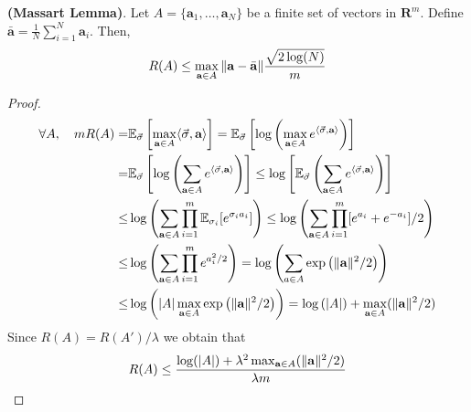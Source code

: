 \begin{lemma}
    \textbf{(Massart Lemma)}.
    Let $ A = \{ \mathbf{a}_1, \ldots, \mathbf{a}_N \} $ be a finite set of vectors in $ \mathbf{R}^m $.
    Define $ \bar{ \mathbf{a}} = \frac{1}{N} \sum^{N}_{i=1} \mathbf{a}_i $. Then,
    \begin{equation}
        R(A) \le \max_{\mathbf{a} \in A} \Arrowvert \mathbf{a} - \bar{\mathbf{a}} \Arrowvert
        \frac{\sqrt{2\log(N)}}{m} 
    \end{equation}
    \begin{proof}
        \begin{align*}
            \forall A,\quad
            m R(A) =& \mathbb{E}_{\vec\sigma} \left[ \max_{\mathbf{a}\in A } \langle \vec \sigma, \textbf{a} \rangle \right]
            = \mathbb{E}_{\vec\sigma}\left[ \log \left(  \max_{\mathbf{a}\in A } e^{\langle \vec \sigma, \textbf{a} \rangle } \right) \right]\\
            =& \mathbb{E}_{\vec\sigma}\left[ \log \left(  \sum_{\mathbf{a}\in A } e^{\langle \vec \sigma, \textbf{a} \rangle } \right) \right]
            \le \log \left[ \mathbb{E}_{\vec\sigma} \left(  \sum_{\mathbf{a}\in A } e^{\langle \vec \sigma, \textbf{a} \rangle } \right) \right] \\
            \le& \log \left(  \sum_{\mathbf{a}\in A } \prod^m_{i=1} \mathbb{E}_{\sigma_i} [e^{\sigma_i a_i}] \right) 
            \le \log \left(  \sum_{\mathbf{a}\in A } \prod^m_{i=1} [e^{a_i} + e^{-a_i}]/2 \right) \\
            \le& \log \left(  \sum_{\mathbf{a}\in A } \prod^m_{i=1} e^{a_i^2/2} \right) 
            = \log \left( \sum^{}_{a \in A} \exp \left( \Arrowvert \mathbf{a} \Arrowvert^2/2 \right) \right)\\
            \le& \log \left( \left| A \right| \max_{\mathbf{a} \in A} \exp \left( \Arrowvert \mathbf{a} \Arrowvert^2/2 \right) \right) = \log \left( \left| A \right| \right) + \max_{\mathbf{a} \in A } (\Arrowvert \mathbf{a} \Arrowvert^2 /2)
        \end{align*}
        Since $ R(A) = R(A')/\lambda $ we obtain that
        \[
            R(A) \le \frac{\log(|A|) + \lambda^2 \max_{\mathbf{a} \in A } (\Arrowvert \mathbf{a} \Arrowvert^2 /2)}{\lambda m}
        \]
    \end{proof}
\end{lemma}

